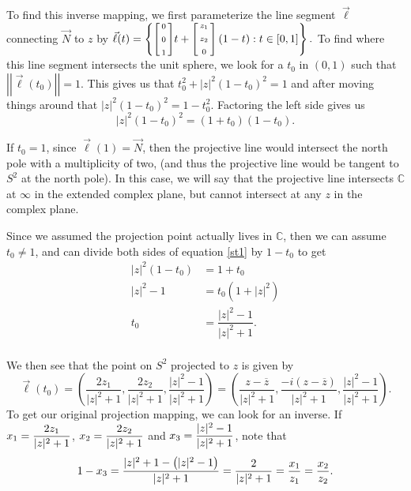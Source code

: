 To find this inverse mapping, we first parameterize the line segment $\vec{\ell}$ connecting $\vec{N}$ to $z$ by $\vec{\ell}(t)=\left\{\begin{bsmallmatrix}0\\ \\ 0\\\\1\end{bsmallmatrix}t+{\begin{bsmallmatrix}z_1 \\ \\ z_2 \\ \\ 0 
\end{bsmallmatrix}}\left(1-t\right):t\in[0,1]\right\}.$ To find where this line segment intersects the unit sphere, we look for a $t_0$ in $(0,1)$ such that $\left|\left|\vec{\ell}(t_0)\right|\right|=1$. This gives us that $t_0^2+|z|^2(1-t_0)^2=1$ and after moving things around that $|z|^2(1-t_0)^2=1-t_0^2$. Factoring the left side gives us \begin{equation}
    |z|^2(1-t_0)^2=(1+t_0)(1-t_0).\label{st1}
\end{equation} 

If $t_0=1$, since $\vec{\ell}(1)=\vec{N}$, then the projective line would intersect the north pole with a multiplicity of two, (and thus the projective line would be tangent to $S^2$ at the north pole). In this case, we will say that the projective line intersects $\mathbb{C}$ at $\infty$ in the extended complex plane, but cannot intersect at any $z$ in the complex plane.

Since we assumed the projection point actually lives in $\mathbb{C}$, then we can assume $t_0\neq 1$, and can divide both sides of equation \eqref{st1} by $1-t_0$ to get \begin{equation}\begin{split}|z|^2(1-t_0)&=1+t_0\\|z|^2-1&=t_0(1+|z|^2)\\t_0&=\dfrac{|z|^2-1}{|z|^2+1}.\\\end{split}\end{equation}

We then see that the point on $S^2$ projected to $z$ is given by \begin{equation}\vec{\ell}(t_0)=\left(\dfrac{2z_1}{|z|^2+1},\dfrac{2z_2}{|z|^2+1},\dfrac{|z|^2-1}{|z|^2+1}\right)=\left(\dfrac{z-\overline{z}}{|z|^2+1},\dfrac{-i(z-\overline{z})}{|z|^2+1},\dfrac{|z|^2-1}{|z|^2+1}\right).\end{equation} To get our original projection mapping, we can look for an inverse. If $x_1=\dfrac{{2z_1}}{{|z|^2+1}}$, $x_2=\dfrac{{2z_2}}{{|z|^2+1}}$ and $x_3=\dfrac{{|z|^2-1}}{{|z|^2+1}}$, note that \begin{equation}1-x_3=\dfrac{|z|^2+1-\left(|z|^2-1\right)}{|z|^2+1}=\dfrac{{2}}{{|z|^2+1}}=\dfrac{{x_1}}{{z_1}}=\dfrac{{x_2}}{{z_2}}.\end{equation}

